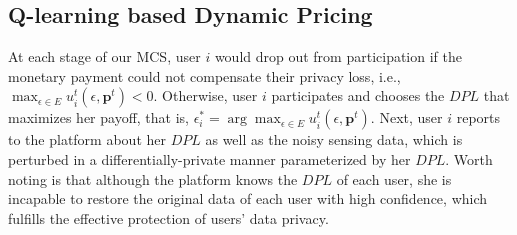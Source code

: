 \subsection{Q-learning based Dynamic Pricing}
At each stage of our MCS, user $i$ would drop out from participation if the monetary payment could not compensate their privacy loss, i.e., $\max_{\epsilon\in E} u^t_i(\epsilon,\mathbf{p}^t)<0$. Otherwise, user $i$ participates and chooses the $DPL$ that maximizes her payoff, that is, $\epsilon_i^*=\arg\max_{\epsilon\in E}u_i^t(\epsilon,\mathbf{p}^t)$. Next, user $i$ reports to the platform about her $DPL$ as well as the noisy sensing data, which is perturbed in a differentially-private manner parameterized by her $DPL$. Worth noting is that although the platform knows the $DPL$ of each user, she is incapable to restore the original data of each user with high confidence, which fulfills the effective protection of users' data privacy. 

